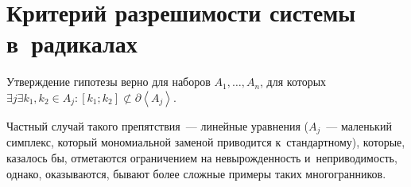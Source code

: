 \documentclass{article}
\begin{document}
\section{Критерий разрешимости системы в~радикалах}

\begin{theorem}
	Утверждение гипотезы верно для наборов $A_1, \ldots, A_n$, для которых
	$\exists j \exists k_1, k_2 \in A_j: [k_1; k_2] \not\subset \partial \left<
	A_j \right>$.
\end{theorem}

Частный случай такого препятствия~--- линейные уравнения ($A_j$~--- маленький
симплекс, который мономиальной заменой приводится к~стандартному), которые,
казалось бы, отметаются ограничением на невырожденность и~неприводимость,
однако, оказываются, бывают более сложные примеры таких многогранников.
\end{document}
